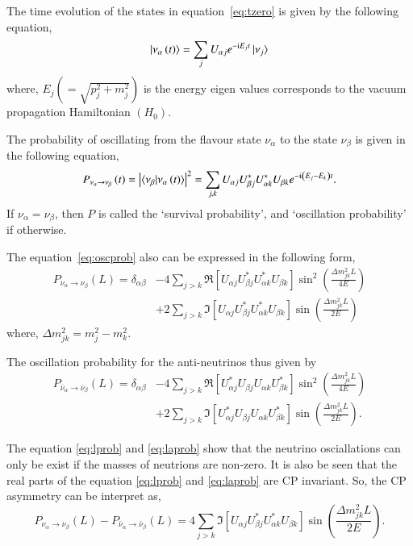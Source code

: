 The time evolution of the states in equation~\ref{eq:tzero} is given
by the following equation,
\begin{equation}
  \ket{\nu_{\alpha}\left(t\right)}=\sum_{j}U_{\alpha j}e^{-\mathrm{i}E_{j}t}\ket{\nu_{j}} \label{eq:ttime}
\end{equation}
where, $E_{j}\left(=\sqrt{p_{j}^{2}+m_{j}^{2}}\right)$ is the energy
eigen values corresponds to the vacuum propagation Hamiltonian
$\left(H_0\right)$.

The probability of oscillating from the flavour state $\nu_\alpha$ to
the state $\nu_\beta$ is given in the following equation,
\begin{equation}
  P_{\nu_\alpha\rightarrow\nu_\beta}\left(t\right) = \left|\braket{\nu_\beta|\nu_\alpha\left(t\right)}\right|^2 = \sum_{j,k}U_{\alpha j}U^{*}_{\beta j}U^{*}_{\alpha k}U_{\beta k}e^{-\mathrm{i}\left(E_{j}-E_{k}\right)t}.
  \label{eq:oscprob}
\end{equation}
If $\nu_\alpha=\nu_\beta$, then $P$ is called the `survival probability',
and `oscillation probability' if otherwise.

The equation~\ref{eq:oscprob} also can be expressed in the following
form,
\begin{align}
  P_{\nu_\alpha\rightarrow\nu_\beta}\left(L\right) = \delta_{\alpha\beta} & -4\sum_{j>k}\Re\left[U_{\alpha j}U^{*}_{\beta j}U^{*}_{\alpha k}U_{\beta k}\right]\sin^2\left(\frac{\Delta m^2_{jk}L}{4E}\right) \nonumber\\
  & +2\sum_{j>k}\Im\left[U_{\alpha j}U^{*}_{\beta j}U^{*}_{\alpha k}U_{\beta k}\right]\sin\left(\frac{\Delta m^2_{jk}L}{2E}\right)
  \label{eq:lprob}
\end{align}
where, $\Delta m^2_{jk}=m^2_{j}-m^2_{k}$.

The oscillation probability for the anti-neutrinos thus given by
\begin{align}
  P_{\bar{\nu}_\alpha\rightarrow\bar{\nu}_\beta}\left(L\right) = \delta_{\alpha\beta} & -4\sum_{j>k}\Re\left[U^{*}_{\alpha j}U_{\beta j}U_{\alpha k}U^{*}_{\beta k}\right]\sin^2\left(\frac{\Delta m^2_{jk}L}{4E}\right) \nonumber\\
  & +2\sum_{j>k}\Im\left[U^{*}_{\alpha j}U_{\beta j}U_{\alpha k}U^{*}_{\beta k}\right]\sin\left(\frac{\Delta m^2_{jk}L}{2E}\right).
  \label{eq:laprob}
\end{align}

The equation \ref{eq:lprob} and \ref{eq:laprob} show that the neutrino
osciallations can only be exist if the masses of neutrions are
non-zero. It is also be seen that the real parts of the equation
\ref{eq:lprob} and \ref{eq:laprob} are CP invariant. So, the CP
asymmetry can be interpret as,
\begin{equation}  P_{\nu_\alpha\rightarrow\nu_\beta}\left(L\right)-P_{\bar{\nu}_\alpha\rightarrow\bar{\nu}_\beta}\left(L\right) = 4\sum_{j>k}\Im\left[U_{\alpha j}U^{*}_{\beta j}U^{*}_{\alpha k}U_{\beta k}\right]\sin\left(\frac{\Delta m^2_{jk}L}{2E}\right).
  \label{eq:cpass}
\end{equation}

